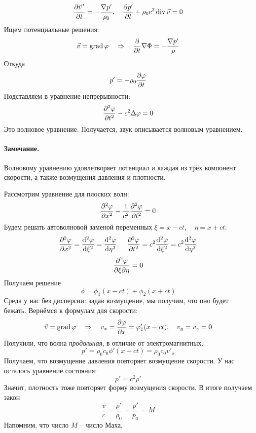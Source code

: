 \begin{equation}
    \pdv{\pvec{v}'}{t} = -\frac{\nabla p'}{\rho_0}, \quad
    \pdv{p'}{t} + \rho_0 c^2 \Div \vec{v} = 0
\end{equation}
Ищем потенциальные решения:
\begin{equation}
    \vec{v} = \operatorname{grad} \varphi 
    \quad\Rightarrow\quad 
    \pdv{t} \nabla \Phi = -\frac{\nabla p'}{\rho}
\end{equation}
Откуда
\begin{equation}
    p' = -\rho_0 \pdv{\varphi}{t}
\end{equation}
Подставляем в уравнение непрерывности:
\begin{equation}
    \pdv[2]{\varphi}{t} - c^2 \Delta\varphi = 0
\end{equation}
Это волновое уравнение. Получается, звук описывается 
волновым уравнением. 

\paragraph{Замечание.} Волновому уравнению удовлетворяет потенциал
и каждая из трёх компонент скорости, а также возмущения давления и плотности.

Рассмотрим уравнение для плоских волн:
\begin{equation}
    \pdv[2]{\varphi}{x}-\frac{1}{c^2} \pdv[2]{\varphi}{t}=0
\end{equation}
Будем решать автоволновой заменой переменных $\xi = x-ct, \quad \eta=x+ct$:
\begin{equation}
    \pdv[2]{\varphi}{x} = \dv[2]{\varphi}{\xi} = \dv[2]{\varphi}{\eta}, \quad
    \pdv[2]{\varphi}{t} = c^2 \dv[2]{\varphi}{\xi}=
        c^2 \dv[2]{\varphi}{\eta}
\end{equation}
\begin{equation}
    \pdv[2]{\varphi}{\xi}{\eta}=0
\end{equation}
Получаем решение
\begin{equation}
    \phi = \phi_1(x-ct)+\phi_2(x+ct)
\end{equation}
Среда у нас без дисперсии: задав возмущение, мы получим, что оно будет бежать.
Вернёмся к формулам для скорости:
\begin{equation}
    \vec{v} = \operatorname{grad}\varphi 
    \quad\Rightarrow\quad 
    v_x = \pdv{\varphi}{x} = \varphi'_1(x-ct), \quad 
    v_y = v_z = 0
\end{equation}
Получили, что волна \textit{продольная}, в отличие от электромагнитных.
\begin{equation}
    p' = \rho_0 c_0 \phi' (x-ct) = \rho_{0} c_0 v'_x
\end{equation}
Получаем, что возмущение давления повторяет возмущение скорости. У нас 
осталось уравнение состояния:
\begin{equation}
    p' = c^2\rho'
\end{equation}
Значит, плотность  тоже повторяет форму возмущения скорости. В итоге получаем
закон
\begin{equation}
    \frac{v}{c} = \frac{\rho'}{\rho_0} = \frac{p'}{p_0}=M
\end{equation}
Напомним, что число $M$ -- число Маха.


